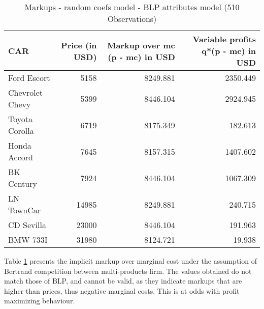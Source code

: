 \documentclass{article}\usepackage[]{graphicx}\usepackage[]{color}
\begin{document}
\begin{table}[ht]
\centering
\caption{Markups -  random coefs model - BLP attributes model 
 (510 Observations)} 
\label{tbl:blp1_markups}
\begingroup\footnotesize
\begin{tabular}{lrrr}
  \toprule 
 CAR & Price (in USD) & Markup over mc (p - mc) in USD & Variable profits q*(p - mc) in USD \\
 \midrule 
 Ford Escort & 5158 & 8249.881 & 2350.449 \\ 
  Chevrolet Chevy & 5399 & 8446.104 & 2924.945 \\ 
  Toyota Corolla & 6719 & 8175.349 & 182.613 \\ 
  Honda Accord & 7645 & 8157.315 & 1407.602 \\ 
  BK Century & 7924 & 8446.104 & 1067.309 \\ 
  LN TownCar & 14985 & 8249.881 & 240.715 \\ 
  CD Sevilla & 23000 & 8446.104 & 191.963 \\ 
  BMW 733I & 31980 & 8124.721 & 19.938 \\ 
   \bottomrule 
\end{tabular}
\endgroup
\end{table}

%

Table \ref{tbl:blp1_markups} presents the implicit markup over marginal cost under the assumption of Bertrand competition between multi-products firm. The values obtained do not match those of BLP, and cannot be valid, as they indicate markups that are higher than prices, thus negative marginal costs. This is at odds with profit maximizing behaviour.
%
\end{document}
